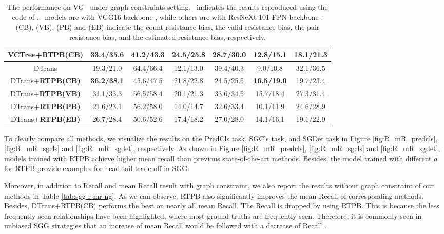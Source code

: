 \documentclass[letterpaper]{article} %
\begin{document}
\begin{table}[!ht]
\begin{tabular}{c|cc|cc|cc}
		VCTree+\textbf{RTPB(CB)  }               & 33.4/35.6     & 41.2/43.3    &\textbf{ 24.5/25.8}    & 28.7/30.0   & 12.8/15.1    & 18.1/21.3   \\ \hline
		DTrans                         & 19.3/21.0     & 64.4/66.4    & 12.1/13.0    & 39.4/40.3   & 9.0/10.8     & 32.1/36.5   \\
		DTrans+\textbf{RTPB(CB) }                & \textbf{36.2/38.1}    & 45.6/47.5    & 21.8/22.8    & 24.5/25.5   & \textbf{16.5/19.0}    & 19.7/23.4   \\
		DTrans+\textbf{RTPB(VB)}   & 31.1/33.3                    & 56.5/58.4                  & 20.1/21.3                 & 33.6/34.5 & 15.7/18.4 & 27.3/31.4 \\
		DTrans+\textbf{RTPB(PB)}         & 21.6/23.1        & 56.2/58.0       & 14.0/14.7    & 32.6/33.4   & 10.1/11.9    & 24.6/28.9   \\
		DTrans+\textbf{RTPB(EB)}                 & 26.7/28.4     & 50.6/52.6    & 17.4/18.2    & 27.0/28.0   & 14.1/16.1    & 19.1/22.9   \\
		
		\hline
	\end{tabular}
	\caption{ The performance on VG~\cite{krishna2016visual} under graph constraints setting. \dag~indicates the results reproduced using the code of \cite{Tang2020_unbiased}. \ddag~models are with VGG16 backbone \cite{simonyan2014very}, while others are with ResNeXt-101-FPN backbone \cite{Lin_2017_ICCV}. (CB), (VB), (PB) and (EB) indicate the count resistance bias, the valid resistance bias, the pair resistance bias, and the estimated resistance bias, respectively.}
	\label{tab:sgg-r-mr}
\end{table}
To clearly compare all methods, we visualize the results on the PredCls task, SGCls task, and SGDet task in Figure \ref{fig:R_mR_predcls}, \ref{fig:R_mR_sgcls} and \ref{fig:R_mR_sgdet}, respectively.  As shown in Figure \ref{fig:R_mR_predcls}, \ref{fig:R_mR_sgcls} and \ref{fig:R_mR_sgdet}, models trained with RTPB achieve higher mean recall than previous state-of-the-art methods. Besides, the model trained with different $a$ for RTPB provide examples for head-tail trade-off in SGG.

Moreover, in addition to Recall and mean Recall result with graph constraint, we also report the results without graph constraint of our methods in Table \ref{tab:sgg-r-mr-ng}. As we can observe, RTPB also significantly improves the mean Recall of corresponding methods. Besides, DTrans+RTPB(CB) performs the best on nearly all mean Recall. The Recall is dropped by using RTPB. This is because the less frequently seen relationships have been highlighted, where most ground truths are frequently seen. Therefore, it is commonly seen in unbiased SGG strategies that an increase of mean Recall would be followed with a decrease of Recall \cite{Tang2020_unbiased}. 
\end{document}
